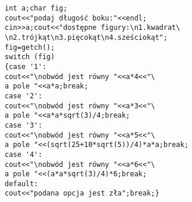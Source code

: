 \begin{verbatim}
int a;char fig; 
cout<<"podaj długość boku:"<<endl;
cin>>a;cout<<"dostępne figury:\n1.kwadrat\
\n2.trójkąt\n3.pięcokąt\n4.sześciokąt";
fig=getch();
switch (fig)
{case '1':
cout<<"\nobwód jest równy "<<a*4<<"\
a pole "<<a*a;break;
case '2':
cout<<"\nobwód jest równy "<<a*3<<"\
a pole "<<a*a*sqrt(3)/4;break;
case '3':
cout<<"\nobwód jest równy "<<a*5<<"\
a pole "<<(sqrt(25+10*sqrt(5))/4)*a*a;break;
case '4':
cout<<"\nobwód jest równy "<<a*6<<"\
a pole "<<(a*a*sqrt(3)/4)*6;break;        
default:
cout<<"podana opcja jest zła";break;}
\end{verbatim}